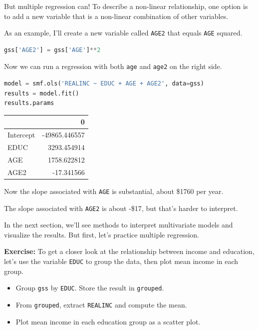 But multiple regression can! To describe a non-linear relationship, one
option is to add a new variable that is a non-linear combination of
other variables.

As an example, I'll create a new variable called
\passthrough{\lstinline!AGE2!} that equals \passthrough{\lstinline!AGE!}
squared.

\begin{lstlisting}[language=Python,style=source]
gss['AGE2'] = gss['AGE']**2
\end{lstlisting}

Now we can run a regression with both \passthrough{\lstinline!age!} and
\passthrough{\lstinline!age2!} on the right side.

\begin{lstlisting}[language=Python,style=source]
model = smf.ols('REALINC ~ EDUC + AGE + AGE2', data=gss)
results = model.fit()
results.params
\end{lstlisting}

\begin{tabular}{lr}
\toprule
{} &             0 \\
\midrule
Intercept & -49865.446557 \\
EDUC      &   3293.454914 \\
AGE       &   1758.622812 \\
AGE2      &    -17.341566 \\
\bottomrule
\end{tabular}

Now the slope associated with \passthrough{\lstinline!AGE!} is
substantial, about \$1760 per year.

The slope associated with \passthrough{\lstinline!AGE2!} is about -\$17,
but that's harder to interpret.

In the next section, we'll see methods to interpret multivariate models
and visualize the results. But first, let's practice multiple
regression.

\textbf{Exercise:} To get a closer look at the relationship between
income and education, let's use the variable
\passthrough{\lstinline!EDUC!} to group the data, then plot mean income
in each group.

\begin{itemize}
\item
  Group \passthrough{\lstinline!gss!} by \passthrough{\lstinline!EDUC!}.
  Store the result in \passthrough{\lstinline!grouped!}.
\item
  From \passthrough{\lstinline!grouped!}, extract
  \passthrough{\lstinline!REALINC!} and compute the mean.
\item
  Plot mean income in each education group as a scatter plot.
\end{itemize}

